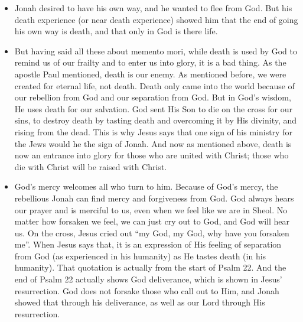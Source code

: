 \begin{itemize}
  \item{Jonah desired to have his own way, and he wanted to flee from God. But his death experience (or near death experience) showed him that the end of going his own way is death, and that only in God is there life.}
  \item{But having said all these about memento mori, while death is used by God to remind us of our frailty and to enter us into glory, it is a bad thing. As the apostle Paul mentioned, death is our enemy. As mentioned before, we were created for eternal life, not death. Death only came into the world because of our rebellion from God and our separation from God. But in God’s wisdom, He uses death for our salvation. God sent His Son to die on the cross for our sins, to destroy death by tasting death and overcoming it by His divinity, and rising from the dead. This is why Jesus says that one sign of his ministry for the Jews would he the sign of Jonah. And now as mentioned above, death is now an entrance into glory for those who are united with Christ; those who die with Christ will be raised with Christ. }
  \item{God’s mercy welcomes all who turn to him. Because of God’s mercy, the rebellious Jonah can find mercy and forgiveness from God. God always hears our prayer and is merciful to us, even when we feel like we are in Sheol. No matter how forsaken we feel, we can just cry out to God, and God will hear us. On the cross, Jesus cried out “my God, my God, why have you forsaken me”. When Jesus says that, it is an expression of His feeling of separation from God (as experienced in his humanity) as He tastes death (in his humanity). That quotation is actually from the start of Psalm 22. And the end of Psalm 22 actually shows God deliverance, which is shown in Jesus’ resurrection. God does not forsake those who call out to Him, and Jonah showed that through his deliverance, as well as our Lord through His resurrection.}
\end{itemize}